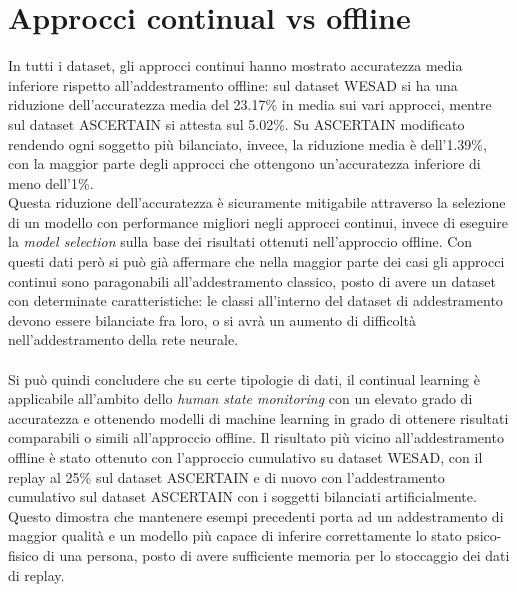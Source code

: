 \section{Approcci continual vs offline}
In tutti i dataset, gli approcci continui hanno mostrato accuratezza media inferiore rispetto all'addestramento offline: sul dataset WESAD si ha una riduzione dell'accuratezza media del 23.17\% in media sui vari approcci, mentre sul dataset ASCERTAIN si attesta sul 5.02\%. Su ASCERTAIN modificato rendendo ogni soggetto più bilanciato, invece, la riduzione media è dell'1.39\%, con la maggior parte degli approcci che ottengono un'accuratezza inferiore di meno dell'1\%.\\
Questa riduzione dell'accuratezza è sicuramente mitigabile attraverso la selezione di un modello con performance migliori negli approcci continui, invece di eseguire la \textit{model selection} sulla base dei risultati ottenuti nell'approccio offline. Con questi dati però si può già affermare che nella maggior parte dei casi gli approcci continui sono paragonabili all'addestramento classico, posto di avere un dataset con determinate caratteristiche: le classi all'interno del dataset di addestramento devono essere bilanciate fra loro, o si avrà un aumento di difficoltà nell'addestramento della rete neurale.\\\\
Si può quindi concludere che su certe tipologie di dati, il continual learning è applicabile all'ambito dello \textit{human state monitoring} con un elevato grado di accuratezza e ottenendo modelli di machine learning in grado di ottenere risultati comparabili o simili all'approccio offline. Il risultato più vicino all'addestramento offline è stato ottenuto con l'approccio cumulativo su dataset WESAD, con il replay al 25\% sul dataset ASCERTAIN e di nuovo con l'addestramento cumulativo sul dataset ASCERTAIN con i soggetti bilanciati artificialmente. Questo dimostra che mantenere esempi precedenti porta ad un addestramento di maggior qualità e un modello più capace di inferire correttamente lo stato psico-fisico di una persona, posto di avere sufficiente memoria per lo stoccaggio dei dati di replay.